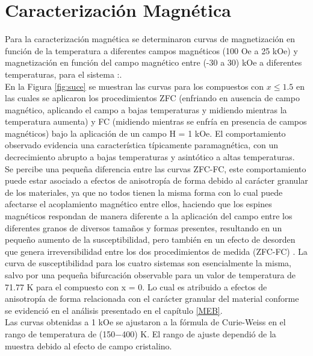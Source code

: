 \chapter{Caracterización Magnética}

Para la caracterización magnética se determinaron curvas de magnetización en
función de la temperatura a diferentes campos magnéticos (100 Oe a 25 kOe) y
magnetización en función del campo magnético entre (-30 a 30) kOe a
diferentes temperaturas, para el sistema
:.\\

En la Figura \ref{fig:suce} se muestran las curvas para los compuestos con $x\leq 1.5$
en las
cuales se aplicaron los procedimientos ZFC (enfriando en ausencia de campo
magnético, aplicando el campo a bajas temperaturas y midiendo mientras la
temperatura aumenta) y FC (midiendo mientras se enfría en presencia de campos
magnéticos) bajo la aplicación de un campo H = 1 kOe. El comportamiento
observado evidencia una característica típicamente paramagnética, con un
decrecimiento abrupto a bajas temperaturas y asintótico a altas temperaturas.\\

Se percibe una pequeña diferencia entre las curvas ZFC-FC, este
comportamiento puede estar asociado a efectos de anisotropía de forma debido al
carácter granular de los materiales, ya que no todos tienen la misma forma con
lo cual puede afectarse el acoplamiento magnético entre ellos, haciendo que los
espines magnéticos respondan de manera diferente a la aplicación del campo
entre los diferentes granos de diversos tamaños y formas presentes, resultando
en un pequeño aumento de la susceptibilidad, pero también en un efecto de
desorden que genera irreversibilidad entre los dos procedimientos de medida
(ZFC-FC) \cite{bustos2018analisis}. La curva de susceptibilidad para los cuatro sistemas son
esencialmente la misma, salvo por una pequeña bifurcación observable para un
valor de temperatura de 71.77 K para el compuesto con x = 0. Lo cual es
atribuido a efectos de anisotropía de forma relacionada con el carácter
granular del material conforme se evidenció en el análisis presentado en el capítulo
\ref{MEB}.\\

Las curvas obtenidas a 1 kOe se ajustaron a la fórmula de Curie-Weiss en el
rango de temperatura de (150$-$400) K. El rango de ajuste dependió de la muestra
debido al efecto de campo cristalino.\\

